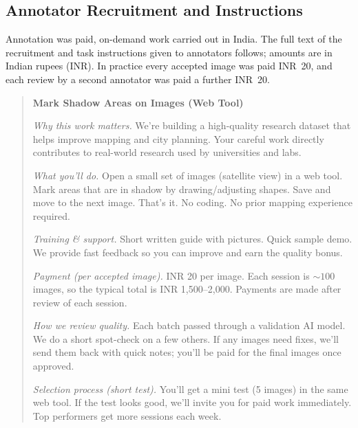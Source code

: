 \subsection{Annotator Recruitment and Instructions}
\label{app:annotator-instructions}

Annotation was paid, on-demand work carried out in India. The full text of the recruitment and task instructions given to annotators follows; amounts are in Indian rupees (INR). In practice every accepted image was paid INR~20, and each review by a second annotator was paid a further INR~20.

\begin{quote}\small
\textbf{Mark Shadow Areas on Images (Web Tool)}

\textit{Why this work matters.} We're building a high-quality research dataset that helps improve mapping and city planning. Your careful work directly contributes to real-world research used by universities and labs.

\textit{What you'll do.} Open a small set of images (satellite view) in a web tool. Mark areas that are in shadow by drawing/adjusting shapes. Save and move to the next image. That's it. No coding. No prior mapping experience required.

\textit{Training \& support.} Short written guide with pictures. Quick sample demo. We provide fast feedback so you can improve and earn the quality bonus.

\textit{Payment (per accepted image).} INR 20 per image. Each session is ${\sim}100$ images, so the typical total is INR 1,500--2,000. Payments are made after review of each session.

\textit{How we review quality.} Each batch passed through a validation AI model. We do a short spot-check on a few others. If any images need fixes, we'll send them back with quick notes; you'll be paid for the final images once approved.

\textit{Selection process (short test).} You'll get a mini test (5 images) in the same web tool. If the test looks good, we'll invite you for paid work immediately. Top performers get more sessions each week.

\end{quote}